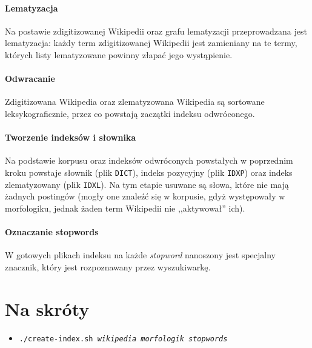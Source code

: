\documentclass[a4paper,12pt]{article}
\begin{document}
\paragraph{Lematyzacja} Na postawie zdigitizowanej Wikipedii oraz grafu
lematyzacji przeprowadzana jest lematyzacja: każdy term zdigitizowanej
Wikipedii jest zamieniany na te termy, których listy lematyzowane powinny
złapać jego wystąpienie.

\paragraph{Odwracanie} Zdigitizowana Wikipedia oraz zlematyzowana Wikipedia
są sortowane leksykograficznie, przez co powstają zaczątki indeksu odwróconego.

\paragraph{Tworzenie indeksów i słownika} Na podstawie korpusu oraz indeksów
odwróconych powstałych w poprzednim kroku powstaje słownik (plik
\texttt{DICT}), indeks pozycyjny (plik \texttt{IDXP}) oraz indeks zlematyzowany
(plik \texttt{IDXL}). Na tym etapie usuwane są słowa, które nie mają żadnych
postingów (mogły one znaleźć się w korpusie, gdyż występowały w morfologiku,
jednak żaden term Wikipedii nie ,,aktywował'' ich).

\paragraph{Oznaczanie stopwords} W gotowych plikach indeksu na każde
\textit{stopword} nanoszony jest specjalny znacznik, który jest rozpoznawany
przez wyszukiwarkę.
\newpage

\section{Na skróty}
\begin{itemize}
	\item \texttt{./create-index.sh \textit{wikipedia morfologik stopwords}}
\end{itemize}
\end{document}
